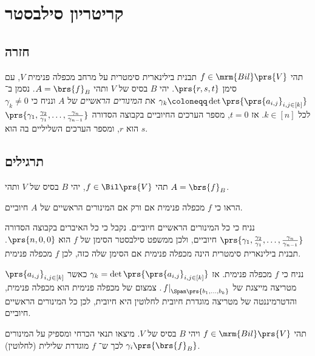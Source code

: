 \documentclass[a4paper,10pt,twoside,openany]{book}
\begin{document}
\section{קריטריון סילבסטר}

\subsection{חזרה}

\begin{theorem}[סילבסטר]
תהי
$f \in \mrm{Bil}\prs{V}$
תבנית בילינארית סימטרית על מרחב מכפלה פנימית
$V$,
עם סימן
$\prs{r,s,t}$.
יהי
$B$
בסיס של
$V$
ותהי
$A = \brs{f}_B$.
נסמן ב־%
$\gamma_k \coloneqq \det\prs{\prs{a_{i,j}}_{i,j \in [k]}}$
את
\emph{המינורים הראשיים}
של
$A$
ונניח כי
$\gamma_k \neq 0$
לכל
$k \in [n]$.
אז
$t = 0$,
מספר הערכים החיוביים בקבוצה הסדורה
$\prs{\gamma_1, \frac{\gamma_2}{\gamma_1}, \ldots, \frac{\gamma_n}{\gamma_{n-1}}}$
הוא
$r$,
ומספר הערכים השליליים בה הוא
$s$.
\end{theorem}

\subsection{תרגילים}

\begin{exercisechap}
תהי
$f \in \Bil\prs{V}$,
יהי
$B$
בסיס של
$V$
ותהי
$A = \brs{f}_B$.

הראו כי
$f$
מכפלה פנימית אם ורק אם המינורים הראשיים של
$A$
חיוביים.
\end{exercisechap}

\begin{solution}
נניח כי כל המינורים הראשיים חיוביים. נקבל כי כל האיברים בקבוצה הסדורה
$\prs{\gamma_1, \frac{\gamma_2}{\gamma_1}, \ldots, \frac{\gamma_n}{\gamma_{n-1}}}$
חיוביים, ולכן ממשפט סילבסטר הסימן של
$f$
הוא
$\prs{n,0,0}$.
תבנית בילינארית סימטרית הינה מכפלה פנימית אם הסימן שלה כזה, לכן
$f$
מכפלה פנימית.

נניח כי
$f$
מכפלה פנימית. אז
$\gamma_k = \det\prs{\prs{a_{i,j}}_{i,j \in [k]}}$
כאשר
$\prs{a_{i,j}}_{i,j \in [k]}$
מטריצה מייצגת של
$\left. f \right|_{\Span\prs{b_1, \ldots, b_k}}$.
צמצום של מכפלה פנימית הוא מכפלה פנימית, והדטרמיננטה של מטריצה מוגדרת חיובית לחלוטין היא חיובית, לכן כל המינורים הראשיים חיוביים.
\end{solution}

\begin{exercisechap}
תהי
$f \in \mrm{Bil}\prs{V}$
ויהי
$B$
בסיס של
$V$.
מיצאו תנאי הכרחי ומספיק על המינורים
$\gamma_i\prs{\brs{f}_B}$
לכך ש־%
$f$
מוגדרת שלילית (לחלוטין).
\end{exercisechap}
\end{document}
